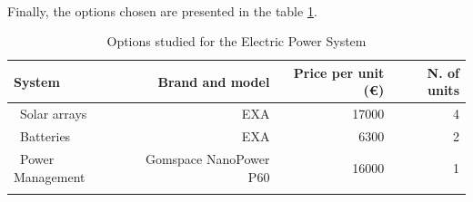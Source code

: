 \paragraph{}Finally, the options chosen are presented in the table \ref{epsfinal}.

\begin{longtable}{| l | r | r | r | }
\hline
\rowcolor[gray]{0.80}	\textbf{System} &  \textbf{Brand and model}     & \textbf{Price per unit (\euro)}  & \textbf{N. of units}  \\
\hline
\endfirsthead

	   ~Solar arrays & EXA & 17000 & 4\\
	   ~Batteries & EXA & 6300 & 2 \\
	   ~Power Management & Gomspace NanoPower P60 & 16000 & 1 \\
	\hline

\caption{Options studied for the Electric Power System}
\label{epsfinal}
\end{longtable}